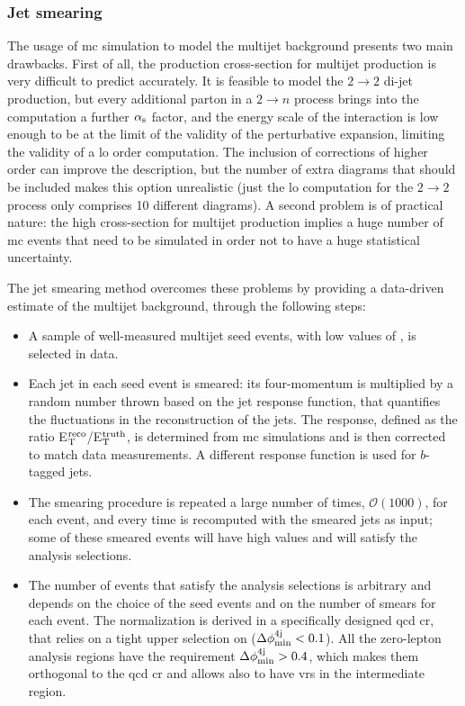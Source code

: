 \subsubsection*{Jet smearing}
\label{sec:jet_smearing}

The usage of \gls{mc} simulation to model the multijet background presents two main drawbacks.
First of all, the production cross-section for multijet production is very difficult to predict accurately. 
It is feasible to model the $2 \to 2$ di-jet production, 
but every additional parton in a $2 \to n$ process brings into the computation a further $\alpha_{\rm{s}}$ factor, 
and the energy scale of the interaction is low enough to be at the limit of the validity of the perturbative expansion, limiting the validity of a  \gls{lo} order computation. The inclusion of corrections of higher order can improve the description, but the number of extra diagrams that should be included makes this option unrealistic (just the \gls{lo} computation for the $2 \to 2$ process only comprises 10 different diagrams).
A second problem is of practical nature: the high cross-section for multijet production implies a huge number of \gls{mc} events that need to be simulated in order not to have a huge statistical uncertainty. 

The jet smearing method overcomes these problems by providing a data-driven estimate of the multijet background, through the following steps:
\begin{itemize}
\item A sample of well-measured multijet seed events, with low values of \met, is selected in data.

\item Each jet in each seed event is smeared: its four-momentum is multiplied by a random number thrown based on the jet response function, that quantifies the fluctuations in the \pt reconstruction of the jets. The response, defined as the ratio E$_{\rm{T}}^{\rm{reco}}$/E$_{\rm{T}}^{\rm{truth}}$, is determined from \gls{mc} simulations and is then corrected to match data measurements. 
A different response function is used for $b$-tagged jets. 

\item The smearing procedure is repeated a large number of times, $\mathcal{O}(1000)$, for each event, and every time \met is recomputed with the smeared jets as input; some of these smeared events will have high \met values and will satisfy the analysis selections.

\item The number of events that satisfy the analysis selections is arbitrary and depends on the choice of the seed events and on the number of smears for each event. The normalization is derived in a specifically designed \gls{qcd} \gls{cr}, that relies on a tight upper selection on \dphimin ($\Delta\phi_{\rm{min}}^{4{\rm{j}}} < 0.1$). All the zero-lepton analysis regions have the requirement $\Delta\phi_{\rm{min}}^{4{\rm{j}}} > 0.4$, which makes them orthogonal to the \gls{qcd} \gls{cr} and allows also to have \glspl{vr} in the intermediate region. 
\end{itemize}

